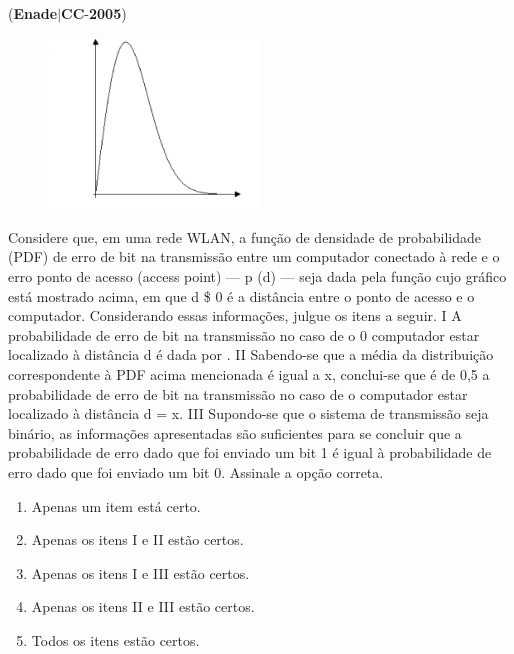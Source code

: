 \documentclass{exam}
\begin{document}
\begin{questions}
\question (\textbf{Enade}$|$\textbf{CC}-\textbf{2005}) \begin{figure}[H]
	\begin{center}
		\includegraphics[width=0.5\textwidth]{CIENCIA_DA_COMPUTACAO_Prova2005-utf8_figuras/fig-0043.jpg}
	\end{center}
\end{figure}
Considere que, em uma rede WLAN, a função de
densidade de probabilidade (PDF) de erro de bit na
transmissão entre um computador conectado à rede e o
erro
ponto de acesso (access point) — p (d) — seja dada
pela função cujo gráfico está mostrado acima, em que d
\$ 0 é a distância entre o ponto de acesso e o
computador.
Considerando essas informações, julgue os itens a seguir.
I A probabilidade de erro de bit na transmissão no caso de o
0
computador estar localizado à distância d é dada
por .
II Sabendo-se que a média da distribuição correspondente
à PDF acima mencionada é igual a x, conclui-se que é de
0,5 a probabilidade de erro de bit na transmissão no caso
de o computador estar localizado à distância d = x.
III Supondo-se que o sistema de transmissão seja binário, as
informações apresentadas são suficientes para se
concluir que a probabilidade de erro dado que foi enviado
um bit 1 é igual à probabilidade de erro dado que foi
enviado um bit 0.
Assinale a opção correta.
	\begin{enumerate}[label=\alph*)]
		\item  Apenas um item está certo.
		\item  Apenas os itens I e II estão certos.
		\item  Apenas os itens I e III estão certos.
		\item  Apenas os itens II e III estão certos.
		\item  Todos os itens estão certos.

	\end{enumerate}


\end{questions}
\end{document}
